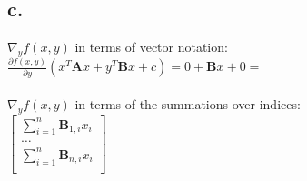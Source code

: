 \documentclass{article}
\newcommand{\1}{\mathbf{1}}
\newcommand{\mat}[1]{\boldsymbol{#1}} %
\begin{document}
{\subsection*{c.}
$\nabla_y f(x,y)$ in terms of vector notation: \\
$\frac{\partial f(x,y)}{\partial y}(x^T \mat{A} x + y^T \mat{B} x + c) = 0 + \mat{B}x + 0 =$ \framebox[1.1\width]{\textbf{$ \mat{B}x$}} \\ \\
$\nabla_y f(x,y)$ in terms of the summations over indices: \\ 
$\begin{bmatrix}
\sum_{i=1}^{n} \mat{B}_{1,i}x_i \\
\dots \\
\sum_{i=1}^{n} \mat{B}_{n,i}x_i \\
\end{bmatrix}$
}
\end{document}
